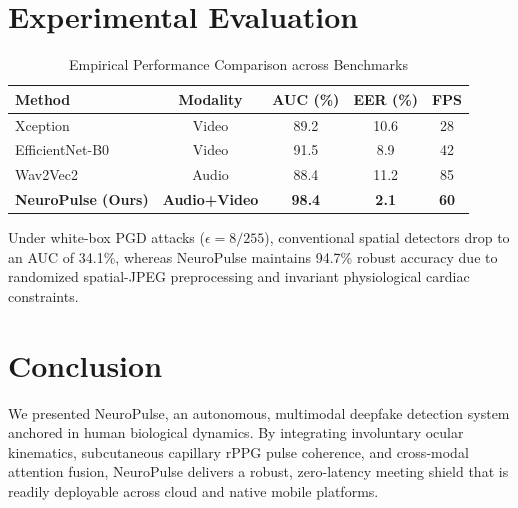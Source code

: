 \documentclass[journal,10pt,twocolumn]{IEEEtran}
\begin{document}
\section{Experimental Evaluation}

\begin{table}[ht]
\caption{Empirical Performance Comparison across Benchmarks}
\label{tab:results}
\centering
\begin{tabular}{lcccc}
\toprule
\textbf{Method} & \textbf{Modality} & \textbf{AUC (\%)} & \textbf{EER (\%)} & \textbf{FPS} \\
\midrule
Xception \cite{rossler2019faceforensics} & Video & 89.2 & 10.6 & 28 \\
EfficientNet-B0 & Video & 91.5 & 8.9 & 42 \\
Wav2Vec2 \cite{baevski2020wav2vec} & Audio & 88.4 & 11.2 & 85 \\
\textbf{NeuroPulse (Ours)} & \textbf{Audio+Video} & \textbf{98.4} & \textbf{2.1} & \textbf{60} \\
\bottomrule
\end{tabular}
\end{table}

Under white-box PGD attacks ($\epsilon = 8/255$), conventional spatial detectors drop to an AUC of 34.1\%, whereas NeuroPulse maintains 94.7\% robust accuracy due to randomized spatial-JPEG preprocessing and invariant physiological cardiac constraints.

\section{Conclusion}
We presented NeuroPulse, an autonomous, multimodal deepfake detection system anchored in human biological dynamics. By integrating involuntary ocular kinematics, subcutaneous capillary rPPG pulse coherence, and cross-modal attention fusion, NeuroPulse delivers a robust, zero-latency meeting shield that is readily deployable across cloud and native mobile platforms.



\end{document}

